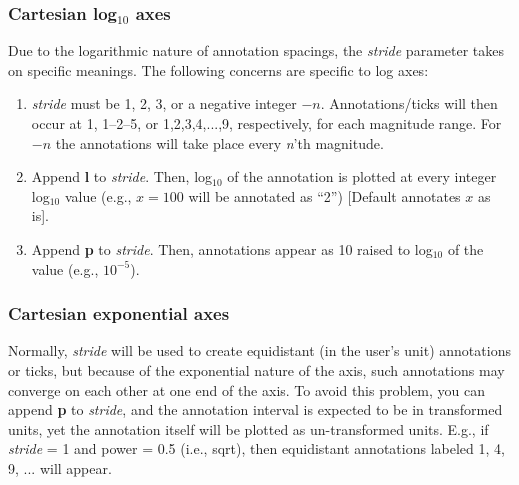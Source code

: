 
\subsubsection{Cartesian log$_{10}$ axes}

Due to the logarithmic nature of annotation spacings, the \emph{stride} parameter takes on specific
meanings.  The following concerns are specific to log axes:

\begin{enumerate}
\item \emph{stride} must be 1, 2, 3, or a negative integer $-n$.  Annotations/ticks will
then occur at 1, 1--2--5, or 1,2,3,4,...,9, respectively, for each magnitude range.
For $-n$ the annotations will take place every {\it n}'th magnitude.

\item Append \textbf{l} to \emph{stride}. Then, log$_{10}$ of the annotation
is plotted at every integer log$_{10}$ value (e.g., $x = 100$ will be annotated as ``2'')
[Default annotates $x$ as is].

\item Append \textbf{p} to \emph{stride}.  Then, annotations appear as 10
raised to log$_{10}$ of the value (e.g., $10^{-5}$).

\end{enumerate}


\subsubsection{Cartesian exponential axes}
Normally, \emph{stride} will be used to create equidistant (in the user's unit) annotations
or ticks, but because of the exponential nature of the axis, such annotations may converge
on each other at one end of the axis.  To avoid this problem, you can
append \textbf{p }to \emph{stride}, and the annotation
interval is expected to be in transformed units, yet the annotation itself will be plotted
as un-transformed units.  E.g., if \emph{stride} = 1 and power = 0.5 (i.e., sqrt),
then equidistant annotations labeled 1, 4, 9, ... will appear.

